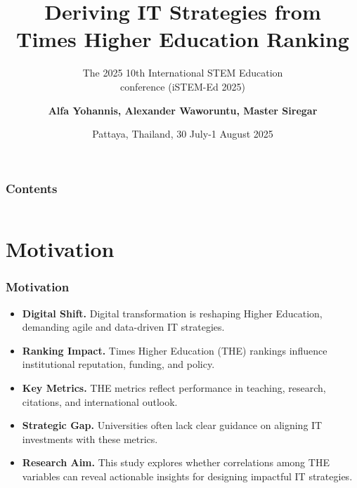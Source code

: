 \documentclass[aspectratio=169, table]{beamer}
\subtitle{The 2025 10th International STEM Education\\conference (iSTEM-Ed 2025)}
\title{\LARGE Deriving IT Strategies from  \\
Times Higher Education Ranking\\
\vspace{7pt}}
\date[Serial]{Pattaya, Thailand, 30 July-1 August 2025}
\author{\textbf{Alfa Yohannis, Alexander Waworuntu, Master Siregar}}
\begin{document}
\frame{\titlepage}


\begin{frame}[fragile]
\frametitle{Contents}
\vspace{20pt}
\begin{columns}[t]
	\tableofcontents[sections={1-8}]
	
	\tableofcontents[sections={9-15}]
\end{columns}
\end{frame}



\section{Motivation}
\begin{frame}
	\vspace{20pt}
	\frametitle{Motivation}
	\begin{itemize}
		\item \textbf{Digital Shift.} Digital transformation is reshaping Higher Education, demanding agile and data-driven IT strategies.
		\item \textbf{Ranking Impact.} Times Higher Education (THE) rankings influence institutional reputation, funding, and policy.
		\item \textbf{Key Metrics.} THE metrics reflect performance in teaching, research, citations, and international outlook.
		\item \textbf{Strategic Gap.} Universities often lack clear guidance on aligning IT investments with these metrics.
		\item \textbf{Research Aim.} This study explores whether correlations among THE variables can reveal actionable insights for designing impactful IT strategies.
	\end{itemize}
\end{frame}
\end{document}
